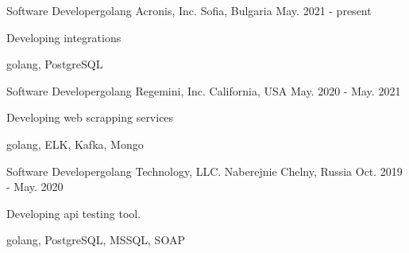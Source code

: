 

\begin{cventries}


  \cventry
    {Software Developer{\enskip\cdotp\enskip}golang} %
    {Acronis, Inc.} %
    {Sofia, Bulgaria} %
    {May. 2021 - present} %
    {
      \begin{cvitems} %
        \item {Developing integrations}
        \item {golang, PostgreSQL}
      \end{cvitems}
    }
    
  \cventry
    {Software Developer{\enskip\cdotp\enskip}golang} %
    {Regemini, Inc.} %
    {California, USA} %
    {May. 2020 - May. 2021} %
    {
      \begin{cvitems} %
        \item {Developing web scrapping services}
        \item {golang, ELK, Kafka, Mongo}
      \end{cvitems}
    }

  \cventry
    {Software Developer{\enskip\cdotp\enskip}golang} %
    {Technology, LLC.} %
    {Naberejnie Chelny, Russia} %
    {Oct. 2019 - May. 2020} %
    {
      \begin{cvitems} %
        \item {Developing api testing tool.}
        \item {golang, PostgreSQL, MSSQL, SOAP}
      \end{cvitems}
    }


\end{cventries}
